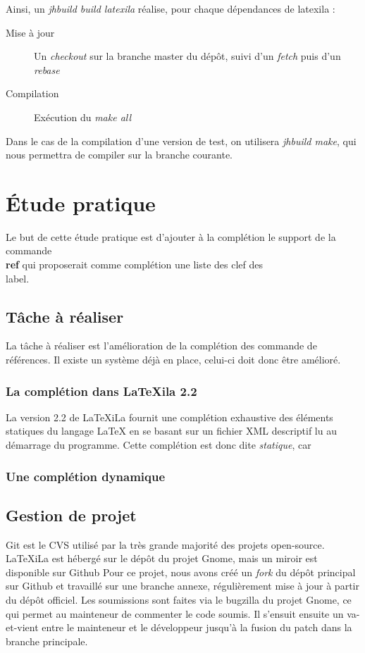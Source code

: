 \documentclass[a4paper,11pt]{report}
\begin{document}
Ainsi, un \textit{jhbuild build latexila} réalise, pour chaque dépendances de latexila :

\begin{description} 
  \item[Mise à jour] Un \textit{checkout} sur la branche master du dépôt, suivi d'un \textit{fetch} puis d'un \textit{rebase} 
  \item[Compilation] Exécution du \textit{make all}
\end{description}

Dans le cas de la compilation d'une version de test, on utilisera \textit{jhbuild make}, qui nous permettra de compiler sur la branche courante.

\chapter{Étude pratique} %
\label{cha:etude_pratique}
Le but de cette étude pratique est d'ajouter à la complétion le support de la commande \textbf{\\ref} qui proposerait comme complétion une liste des clef des \\label. 

\section{Tâche à réaliser} %
\label{sec:tache_a_realiser}
La tâche à réaliser est l'amélioration de la complétion des commande de références. Il existe un système déjà en place, celui-ci doit donc être amélioré.

\subsection{La complétion dans LaTeXila 2.2}
\label{sub:completion}
La version 2.2 de LaTeXiLa fournit une complétion exhaustive des éléments statiques du langage LaTeX en se basant sur un fichier XML descriptif lu au démarrage du programme.
Cette complétion est donc dite \textit{statique}, car 

\subsection{Une complétion dynamique}
\label{sub:completion_dyn}


\section{Gestion de projet} %
\label{sec:git}
Git est le CVS utilisé par la très grande majorité des projets open-source. LaTeXiLa est hébergé sur le dépôt du projet Gnome, mais un miroir est disponible sur Github %
Pour ce projet, nous avons créé un \textit{fork} du dépôt principal sur Github et travaillé sur une branche annexe, régulièrement mise à jour à partir du dépôt officiel.
Les soumissions sont faites via le bugzilla du projet Gnome, ce qui permet au mainteneur de commenter le code soumis. Il s'ensuit ensuite un va-et-vient entre le mainteneur et le développeur jusqu'à la fusion du patch dans la branche principale.
\end{document}
